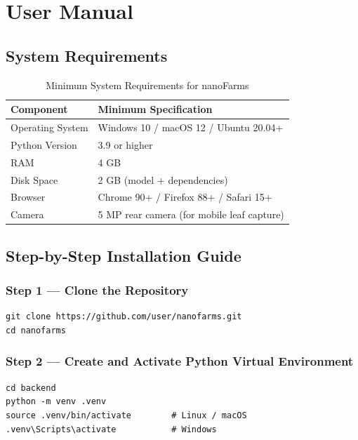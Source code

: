 \documentclass[12pt,oneside]{report}
\begin{document}

\appendix

\chapter{User Manual}
\label{appendix:manual}

\section{System Requirements}
\begin{table}[H]
\centering
\caption{Minimum System Requirements for nanoFarms}
\begin{tabular}{@{}ll@{}}
\toprule
\textbf{Component} & \textbf{Minimum Specification} \\ \midrule
Operating System & Windows 10 / macOS 12 / Ubuntu 20.04+ \\
Python Version & 3.9 or higher \\
RAM & 4 GB \\
Disk Space & 2 GB (model + dependencies) \\
Browser & Chrome 90+ / Firefox 88+ / Safari 15+ \\
Camera & 5 MP rear camera (for mobile leaf capture) \\ \bottomrule
\end{tabular}
\end{table}

\section{Step-by-Step Installation Guide}

\subsection{Step 1 — Clone the Repository}
\begin{verbatim}
git clone https://github.com/user/nanofarms.git
cd nanofarms
\end{verbatim}

\subsection{Step 2 — Create and Activate Python Virtual Environment}
\begin{verbatim}
cd backend
python -m venv .venv
source .venv/bin/activate        # Linux / macOS
.venv\Scripts\activate           # Windows
\end{verbatim}
\end{document}

